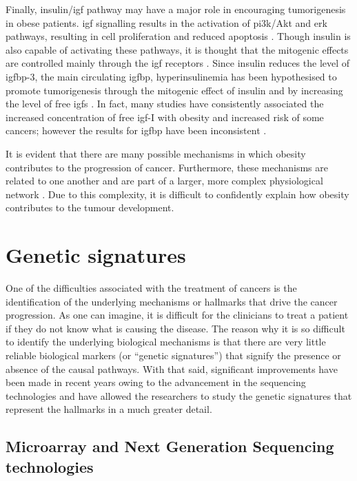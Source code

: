 Finally, insulin/\gls{igf} pathway may have a major role in encouraging tumorigenesis in obese patients.
\gls{igf} signalling results in the activation of \gls{pi3k}/Akt and \gls{erk} pathways, resulting in cell proliferation and reduced apoptosis \citep{Roberts2010}.
Though insulin is also capable of activating these pathways, it is thought that the mitogenic effects are controlled mainly through the \gls{igf} receptors \citep{Roberts2010}.
Since insulin reduces the level of \gls{igfbp}-3, the main circulating \gls{igfbp}, hyperinsulinemia has been hypothesised to promote tumorigenesis through the mitogenic effect of insulin and by increasing the level of free \glspl{igf} \citep{Giovannucci1995,Mckeown1994,Roberts2010}.
In fact, many studies have consistently associated the increased concentration of free \gls{igf}-I with obesity and increased risk of some cancers; however the results for \gls{igfbp} have been inconsistent \citep{Basen2011}.

It is evident that there are many possible mechanisms in which obesity contributes to the progression of cancer.
Furthermore, these mechanisms are related to one another and are part of a larger, more complex physiological network \citep{Renehan2006}.
Due to this complexity, it is difficult to confidently explain how obesity contributes to the tumour development.

\section{Genetic signatures}
\label{sec:genetic_signatures}

One of the difficulties associated with the treatment of cancers is the identification of the underlying mechanisms or hallmarks that drive the cancer progression.
As one can imagine, it is difficult for the clinicians to treat a patient if they do not know what is causing the disease.
The reason why it is so difficult to identify the underlying biological mechanisms is that there are very little reliable biological markers (or ``genetic signatures'') that signify the presence or absence of the causal pathways.
With that said, significant improvements have been made in recent years owing to the advancement in the sequencing technologies and have allowed the researchers to study the genetic signatures that represent the hallmarks in a much greater detail.

\subsection{Microarray and Next Generation Sequencing technologies}
\label{sub:microarray_and_next_generation_sequencing_technologies}

